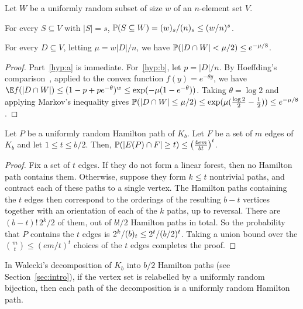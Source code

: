 \begin{lemma}\label{lem:hyp}
Let $W$ be a uniformly random subset of size $w$ of an $n$-element set $V$.
\begin{props}
\item\label{hyp:a} For every $S\subseteq V$ with $|S|=s$, $\mathbb{P}(S\subseteq W)=(w)_{s}/(n)_{s}\le(w/n)^s$.
\item\label{hyp:b} For every $D\subseteq V$, letting $\mu=w|D|/n$, we have $\mathbb{P}(|D\cap W|<\mu/2)\le e^{-\mu/8}$.
\end{props}
\end{lemma}
\begin{proof}
Part~\ref{hyp:a} is immediate. For~\ref{hyp:b}, let $p=|D|/n$. By Hoeffding's comparison~\cite[Theorem 4]{Hoe}, applied to the convex function $f(y)=e^{-\theta y}$, we have $\E f(|D\cap W|)\le(1-p+pe^{-\theta})^w\le\exp(-\mu(1-e^{-\theta}))$. Taking $\theta=\log 2$ and applying Markov's inequality gives $\mathbb{P}(|D\cap W|\le\mu/2)\le\exp(\mu(\tfrac{\log2}2-\tfrac12))\le e^{-\mu/8}$.
\end{proof}

\begin{lemma}\label{lem:ham}
Let $P$ be a uniformly random Hamilton path of $K_b$. Let $F$ be a set of $m$ edges of $K_b$ and let $1\le t\le b/2$. Then, $\mathbb{P}(|E(P)\cap F|\ge t)\le\bigl(\tfrac{4em}{bt}\bigr)^t$.
\end{lemma}
\begin{proof}
Fix a set of $t$ edges. If they do not form a linear forest, then no Hamilton path contains them. Otherwise, suppose they form $k\le t$ nontrivial paths, and contract each of these paths to a single vertex. The Hamilton paths containing the $t$ edges then correspond to the orderings of the resulting $b-t$ vertices together with an orientation of each of the $k$ paths, up to reversal. There are $(b-t)!\,2^k/2$ of them, out of $b!/2$ Hamilton paths in total. So the probability that $P$ contains the $t$ edges is $2^k/(b)_{t}\le 2^t/(b/2)^t$. Taking a union bound over the $\binom mt\le(em/t)^t$ choices of the $t$ edges completes the proof.
\end{proof}

In Walecki's decomposition of $K_b$ into $b/2$ Hamilton paths (see Section~\ref{sec:intro}), if the vertex set is relabelled by a uniformly random bijection, then each path of the decomposition is a uniformly random Hamilton path.
